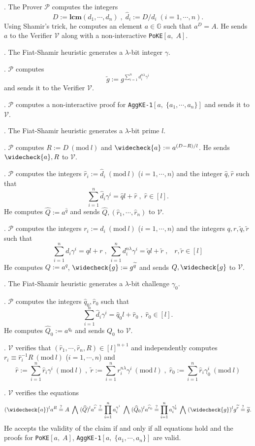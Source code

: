 \documentclass[11pt, lettersize, notitlepage, leqno, footskip=0.6cm]{article}
\newcommand{\pl}{\prod\limits}
\newcommand{\slim}{\sum\limits}
\newcommand{\wti}{\widetilde}
\newcommand{\mc}{\mathcal}
\newcommand{\mb}{\mathbb}
\newcommand{\mbf}{\mathbf}
\newcommand{\lam}{\lambda}
\newcommand{\what}{\widehat}
\newcommand{\weck}{\widecheck}
\newcommand{\vs}{\vspace{-0.15cm}}
\newcommand{\noin}{\noindent}
\newcommand{\sta}{\stackrel{?}{=}}
\newcommand{\Mod}[1]{\ (\mathrm{mod}\ #1)}
\newcommand{\LCM}{\mbf{lcm}}
\numberwithin{equation}{section}
\begin{document}
\begin{prf1} . The Prover $\mc{P}$ computes the integers \vs $$D:= \LCM(d_1,\cdots,d_n)\;,\;\what{d}_i:= D/d_i\;(i=1,\cdots,n).$$ Using Shamir's trick, he computes an element $a\in\mb{G}$ such that $a^D = A$. He sends $a$ to the Verifier $\mc{V}$ along with a non-interactive \verb|PoKE|$[a,\;A]$.

\noin 2. The Fiat-Shamir heuristic generates a $\lam$-bit integer $\gamma$.

\noin 3. $\mc{P}$ computes $$\wti{g}:= g^{\slim_{i=1}^n d_i^{n\lam}\gamma^i}$$ and sends it to the Verifier $\mc{V}$. 

\noin 4. $\mc{P}$ computes a non-interactive proof for \verb|AggKE-1|$[a,\;\{a_1,\cdots,a_n\}]$ and sends it to $\mc{V}$.

\noin 5. The Fiat-Shamir heuristic generates a $\lam$-bit prime $l$.

\noin 6. $\mc{P}$ computes $R:= D\Mod{l}$ and $\weck{a}:= a^{(D-R)/l}$. He sends $\weck{a}, R$ to $\mc{V}$.

\noin 7. $\mc{P}$ computes the integers $\what{r}_i:= \what{d}_i\Mod{l}$ ($i=1,\cdots,n$) and the integer $\what{q},\what{r}$ such that \vs $$\slim_{i=1}^n \what{d}_i\gamma^i = \what{q} l + \what{r}\;,\;\what{r}\in [l].$$ He computes $\what{Q}:= a^{\what{q}}$ and sends $\what{Q}, (\what{r}_1,\cdots,\what{r}_n)$ to $\mc{V}$.

\noin 8. $\mc{P}$ computes the integers ${r}_i:= {d}_i\Mod{l}$ ($i=1,\cdots,n$) and the integers $q,r,\wti{q},\wti{r}$ such that \vs $$\slim_{i=1}^n d_i\gamma^i = ql+r\;,\;\slim_{i=1}^n {d}_i^{n\lam}\gamma^i = \wti{q}l+\wti{r}\;,\;\;\;r,\wti{r}\in[l] $$ He computes ${Q}:= a^q$, $\weck{g}:= g^{\wti{q}}$ and sends ${Q}, \weck{g}$ to $\mc{V}$.

\noin 9. The Fiat-Shamir heuristic generates a $\lam$-bit challenge $\gamma_0$.

\noin 10. $\mc{P}$ computes the integers $\what{q}_0,\what{r}_0$ such that \vs $$\slim_{i=1}^n \what{d}_i\gamma^i = \what{q}_0l+\what{r}_0\;,\;\what{r}_0\in[l].$$ He computes $\what{Q}_0:= a^{q_0}$ and sends ${Q}_0$ to $\mc{V}$.

\noin 11. $\mc{V}$ verifies that $(\what{r}_1,\cdots,\what{r}_n, R)\in [l]^{n+1}$ and independently computes $r_i\equiv \what{r}_i^{-1}R\Mod{l}$ ($i=1,\cdots,n$) and \vs $$\what{r}:= \slim_{i=1}^n \what{r}_i\gamma^i\Mod{l}\;,\;\wti{r}:= {\slim_{i=1}^n r_i^{n\lam}\gamma^i}\Mod{l}\;,\; \what{r}_0:= \slim_{i=1}^n \what{r}_i\gamma_0^i\Mod{l}$$

\noin 12. $\mc{V}$ verifies the equations \vs $$(\weck{a})^la^R\sta A  \;\bigwedge\; (\what{Q})^l a^{\what{r}}\sta \pl_{i=1}^{n} a_i^{\gamma^i}\;\bigwedge\;(\what{Q}_0)^la^{\what{r}_0}\sta \pl_{i=1}^{n} a_i^{\gamma_0^i} \;\bigwedge\; (\weck{g})^lg^{\wti{r}} \sta \wti{g}.$$ He accepts the validity of the claim if and only if all equations hold and the proofs for \verb|PoKE|$[a,\;A]$, \verb|AggKE-1|$[a,\;\{a_1,\cdots,a_n\}]$ are valid.\end{prf1}
\end{document}
